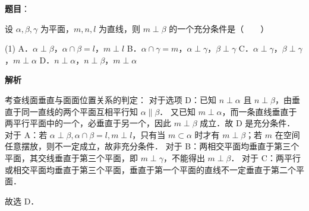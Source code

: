 \begin{answer}

\textbf{题目}：

设 $\alpha, \beta, \gamma$ 为平面，$m, n, l$ 为直线，则 $m \perp \beta$ 的一个充分条件是\mbox{（　　）}

\begin{gkopts}(1)
\task A．$\alpha \perp \beta$，$\alpha \cap \beta = l$，$m \perp l$
\task B．$\alpha \cap \gamma = m$，$\alpha \perp \gamma$，$\beta \perp \gamma$
\task C．$\alpha \perp \gamma$，$\beta \perp \gamma$，$m \perp \alpha$
\task D．$n \perp \alpha$，$n \perp \beta$，$m \perp \alpha$
\end{gkopts}

\textbf{解析}

考查线面垂直与面面位置关系的判定：
对于选项 D：已知 $n \perp \alpha$ 且 $n \perp \beta$，由垂直于同一直线的两个平面互相平行知 $\alpha \parallel \beta$．
又已知 $m \perp \alpha$，而一条直线垂直于两平行平面中的一个，必垂直于另一个，因此 $m \perp \beta$ 成立．故 D 是充分条件．
对于 A：若 $\alpha \perp \beta, \alpha \cap \beta = l, m \perp l$，只有当 $m \subset \alpha$ 时才有 $m \perp \beta$；若 $m$ 在空间任意摆放，则不一定成立，故非充分条件．
对于 B：两相交平面均垂直于第三个平面，其交线垂直于第三个平面，即 $m \perp \gamma$，不能得出 $m \perp \beta$．
对于 C：两平行或相交平面均垂直于第三个平面，垂直于第一个平面的直线不一定垂直于第二个平面．

故选 D．


\end{answer}
